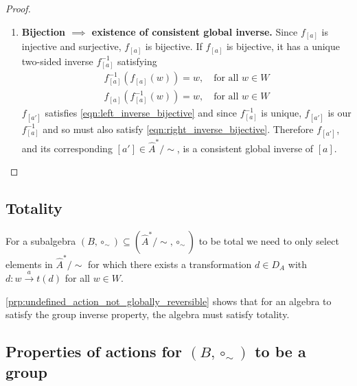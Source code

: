 \begin{proof}
\begin{enumerate}[(1)]
    \item \textbf{Bijection $\implies$ existence of consistent global inverse.}
    Since $f_{[a]}$ is injective and surjective, $f_{[a]}$ is bijective.
    If $f_{[a]}$ is bijective, it has a unique two-sided inverse $f_{[a]}^{-1}$ satisfying
    \begin{align}
        f_{[a]}^{-1}(f_{[a]}(w)) = w, \quad \text{for all $w \in W$} 
        \label{eqn:left_inverse_bijective}
        \\
        f_{[a]}(f_{[a]}^{-1}(w)) = w, \quad \text{for all $w \in W$}
        \label{eqn:right_inverse_bijective}
    \end{align}
    $f_{[a']}$ satisfies \cref{eqn:left_inverse_bijective} and since $f_{[a]}^{-1}$ is unique, $f_{[a']}$ is our $f_{[a]}^{-1}$ and so must also satisfy \cref{eqn:right_inverse_bijective}.
    Therefore $f_{[a']}$, and its corresponding $[a'] \in \hat{A}^{*}/\sim$, is a consistent global inverse of $[a]$.
    \end{enumerate}
\end{proof}

\subsection{Totality}


For a subalgebra $(B, \circ_{\sim}) \subseteq (\hat{A}^{*}/\sim, \circ_{\sim})$ to be total we need to only select elements in $\hat{A}^{*}/\sim$ for which there exists a transformation $d \in D_{A}$ with $d: w \xrightarrow{a} t(d)$ for all $w \in W$.

\cref{prp:undefined_action_not_globally_reversible} shows that for an algebra to satisfy the group inverse property, the algebra must satisfy totality.


\subsection{Properties of actions for $(B, \circ_{\sim})$ to be a group}

